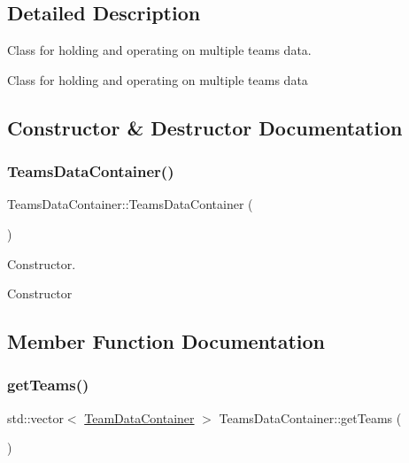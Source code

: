 \subsection{Detailed Description}
Class for holding and operating on multiple teams data. 

Class for holding and operating on multiple teams data 

\subsection{Constructor \& Destructor Documentation}
\mbox{\label{classTeamsDataContainer_a1f89b90ca2fe5f13b7940959afb20096}} 
\subsubsection{\texorpdfstring{TeamsDataContainer()}{TeamsDataContainer()}}
{\footnotesize\ttfamily Teams\+Data\+Container\+::\+Teams\+Data\+Container (\begin{DoxyParamCaption}{ }\end{DoxyParamCaption})}



Constructor. 

Constructor 

\subsection{Member Function Documentation}
\mbox{\label{classTeamsDataContainer_afddf02ba3f5c1cbb45aa855623ff3f35}} 
\subsubsection{\texorpdfstring{getTeams()}{getTeams()}}
{\footnotesize\ttfamily std\+::vector$<$ \mbox{\hyperlink{classTeamDataContainer}{Team\+Data\+Container}} $>$ Teams\+Data\+Container\+::get\+Teams (\begin{DoxyParamCaption}{ }\end{DoxyParamCaption})}



